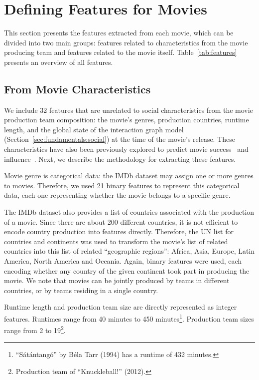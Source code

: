 \section{Defining Features for Movies}
\label{sec:features}

This section presents the features extracted from each movie, which can be
divided into two main groups: features related to characteristics from the
movie producing team and features related to the movie itself.
Table~\ref{tab:features} presents an overview of all features.



\subsection{From Movie Characteristics}
We include 32 features that are unrelated to social characteristics from the
movie production team composition: the movie's genres, production countries,
runtime length, and the global state of the interaction graph model
(Section~\ref{sec:fundamentals:social}) at the time of the movie's release.
These characteristics have also been previously explored to predict movie
success~\citep{Ghiassi2015} and influence~\citep{wasserman2015cross}.  Next, we
describe the methodology for extracting these features.

Movie genre is categorical data: the IMDb dataset may assign one or more genres
to movies. Therefore, we used 21 binary features to represent this categorical
data, each one representing whether the movie belongs to a specific genre.

The IMDb dataset also provides a list of countries associated with the
production of a movie. Since there are about 200 different countries, it is not
efficient to encode country production into features directly. Therefore, the
UN list for countries and continents was used to transform the movie's list of
related countries into this list of related ``geographic regions'': Africa,
Asia, Europe, Latin America, North America and Oceania. Again, binary features
were used, each encoding whether any country of the given continent took part
in producing the movie. We note that movies can be jointly produced by teams in
different countries, or by teams residing in a single country.

Runtime length and production team size are directly represented as integer
features. Runtimes range from 40 minutes to 450
minutes\footnote{``S\'at\'antang\'o'' by B\'ela Tarr (1994) has a runtime of
432 minutes.}. Production team sizes range from 2 to 19\footnote{Production
team of ``Knuckleball!'' (2012).}.

